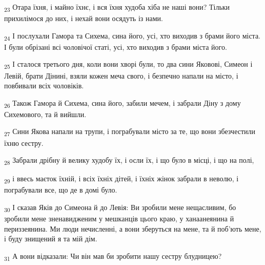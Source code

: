 \begin{tcolorbox}
\textsubscript{23} Отара їхня, і майно їхнє, і вся їхня худоба хіба не наші вони? Тільки прихилімося до них, і нехай вони осядуть із нами.
\end{tcolorbox}
\begin{tcolorbox}
\textsubscript{24} І послухали Гамора та Сихема, сина його, усі, хто виходив з брами його міста. І були обрізані всі чоловічої статі, усі, хто виходив з брами міста його.
\end{tcolorbox}
\begin{tcolorbox}
\textsubscript{25} І сталося третього дня, коли вони хворі були, то два сини Яковові, Симеон і Левій, брати Дінині, взяли кожен меча свого, і безпечно напали на місто, і повбивали всіх чоловіків.
\end{tcolorbox}
\begin{tcolorbox}
\textsubscript{26} Також Гамора й Сихема, сина його, забили мечем, і забрали Діну з дому Сихемового, та й вийшли.
\end{tcolorbox}
\begin{tcolorbox}
\textsubscript{27} Сини Якова напали на трупи, і пограбували місто за те, що вони збезчестили їхню сестру.
\end{tcolorbox}
\begin{tcolorbox}
\textsubscript{28} Забрали дрібну й велику худобу їх, і осли їх, і що було в місці, і що на полі,
\end{tcolorbox}
\begin{tcolorbox}
\textsubscript{29} і ввесь маєток їхній, і всіх їхніх дітей, і їхніх жінок забрали в неволю, і пограбували все, що де в домі було.
\end{tcolorbox}
\begin{tcolorbox}
\textsubscript{30} І сказав Яків до Симеона й до Левія: Ви зробили мене нещасливим, бо зробили мене зненавидженим у мешканців цього краю, у ханаанеянина й периззеянина. Ми люди нечисленні, а вони зберуться на мене, та й поб'ють мене, і буду знищений я та мій дім.
\end{tcolorbox}
\begin{tcolorbox}
\textsubscript{31} А вони відказали: Чи він мав би зробити нашу сестру блудницею?
\end{tcolorbox}
